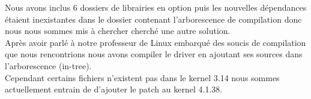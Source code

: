 Nous avons inclus 6 dossiers de librairies en option puis les nouvelles dépendances
étaient inexistantes dans le dossier contenant l’arborescence de compilation donc nous
nous sommes mis à chercher cherché une autre solution. \\

Après avoir parlé à notre professeur de Linux embarqué des soucis de compilation que
nous rencontrions nous avons compiler le driver en ajoutant ses sources dans l’arborescence
(in-tree). \\

Cependant certains fichiers n’existent pas dans le kernel 3.14 nous sommes
actuellement entrain de d’ajouter le patch au kernel 4.1.38.

